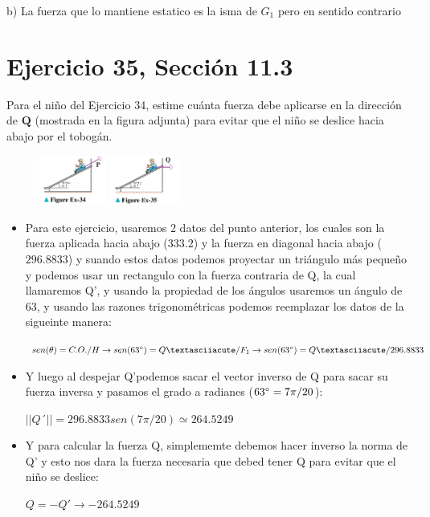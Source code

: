 \documentclass[11pt,letterpaper]{article}
\begin{document}
b) La fuerza que lo mantiene estatico es la isma de $G_1$ pero en sentido contrario

\section{Ejercicio 35, Sección 11.3}
Para el niño del Ejercicio 34, estime cuánta fuerza debe aplicarse en la dirección de $\mathbf{Q}$ (mostrada en la figura adjunta) para evitar que el niño se deslice hacia abajo por el tobogán.

\begin{figure}[h]
    \centering
    \includegraphics[width=0.2\textwidth]{imagenes/Figure_Ex-34.png}
    \hspace{5cm}
    \includegraphics[width=0.2\textwidth]{imagenes/Figure_Ex-35.png}
\end{figure}

\begin{itemize}

    \item Para este ejercicio, usaremos 2 datos del punto anterior, los cuales son la fuerza aplicada hacia abajo ($333.2$) y la fuerza en diagonal hacia abajo ($296.8833$) y suando estos datos podemos proyectar un triángulo más pequeño y podemos usar un rectangulo con la fuerza contraria de Q, la cual llamaremos Q', y usando la propiedad de los ángulos usaremos un ángulo de 63\degree, y usando las razones trigonométricas podemos reemplazar los datos de la sigueinte manera:
    \begin{center}
        $sen(\theta) = C.O./H \rightarrow sen(63\degree) = Q´/F_1 \rightarrow sen(63\degree) = Q´/296.8833$
    \end{center}
    \item Y luego al despejar Q'podemos sacar el vector inverso de Q para sacar su fuerza inversa y pasamos el grado a radianes ($63\degree = 7\pi / 20$):
    \begin{center}
        $||Q´|| = 296.8833 sen(7\pi / 20) \simeq 264.5249$
    \end{center}
    \item Y para calcular la fuerza Q, simplememte debemos hacer inverso la norma de Q' y esto nos dara la fuerza necesaria que debed tener Q para evitar que el niño se deslice:
    \begin{center}
        $Q = -Q' \rightarrow -264.5249$
    \end{center}
    
\end{itemize}
\end{document}
